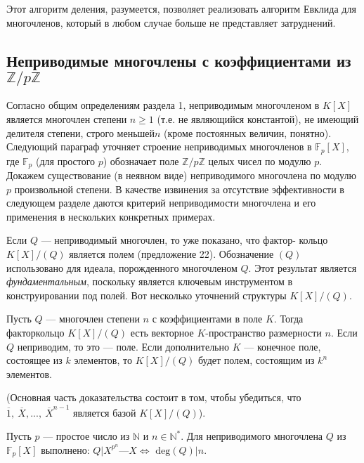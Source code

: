 \documentclass{mai_book}
\begin{document}
Этот алгоритм деления, разумеется, позволяет реализовать  
алгоритм Евклида для многочленов, который в любом случае больше не 
представляет затруднений. 
\subsection{Неприводимые многочлены с коэффициентами из $\mathbb{Z}\slash p\mathbb{Z}$} 
Согласно общим определениям раздела 1, неприводимым многочленом 
в $K[X]$ является многочлен степени $n\geq 1$ (т.е. не являющийся  
константой), не имеющий делителя степени, строго меньшей$n$ (кроме  
постоянных величин, понятно). Следующий параграф уточняет строение 
неприводимых многочленов в $\mathbb{F}_p[X]$, где $\mathbb{F}_p$ (для простого $p$) обозначает 
поле $\mathbb{Z}\slash p\mathbb{Z}$ целых чисел по модулю $p$. Докажем существование (в неявном 
виде) неприводимого многочлена по модулю $p$ произвольной степени. 
В качестве извинения за отсутствие эффективности в следующем  
разделе даются критерий неприводимости многочлена и его применения в 
нескольких конкретных примерах. 

Если $Q$ — неприводимый многочлен, то уже показано, что фактор- 
кольцо $K[X]\slash(Q)$ является полем (предложение 22). Обозначение $(Q)$  
использовано для идеала, порожденного многочленом $Q$. Этот результат 
является \textit{фундаментальным}, поскольку является ключевым  
инструментом в конструировании под полей. Вот несколько уточнений структуры 
$K[X]\slash(Q)$. 

\begin{predl}
\hspace*{15pt}Пусть $Q$ — многочлен степени $n$ с коэффициентами в поле $K$. Тогда 
факторкольцо $K[X]\slash(Q)$ есть векторное $K$-пространство размерности 
$n$. Если $Q$ неприводим, то это — поле. Если дополнительно $K$ —  
конечное поле, состоящее из $k$ элементов, то $K[X]\slash(Q)$ будет полем,  
состоящим из $k^n$ элементов.
\end{predl}

(Основная часть доказательства состоит в том, чтобы убедиться, 
что $\overline{1},\: \overline{X},...,\: \overline{X}^{n-1}\text{ является базой }K[X]\slash(Q)$).

\begin{thm}
\hspace*{15pt}Пусть $p$ — простое число из $\mathbb{N}$ и $ n \in \mathbb{N}^*$. Для неприводимого 
многочлена $Q$ из $\mathbb{F}_p[X]$ выполнено: $Q | X^{p^n} — X \Leftrightarrow$ $\text{deg}(Q) | n$.
\end{thm} 
\newpage
\end{document}
